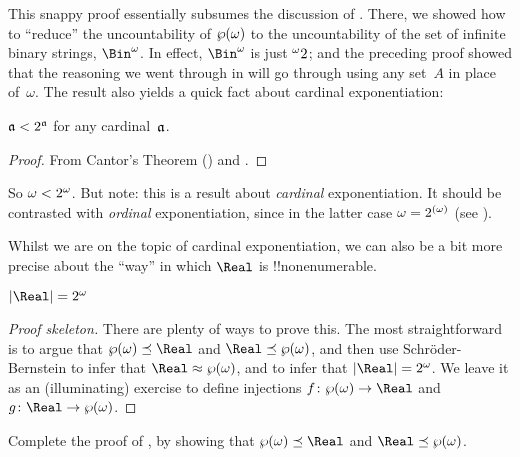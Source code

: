 \documentclass[../../../include/open-logic-section]{subfiles}
\begin{document}
This snappy proof essentially subsumes the discussion of
. There, we showed how to ``reduce'' the
uncountability of $\wp(\omega)$ to the uncountability of the set of
infinite binary strings, $\Bin^\omega$. In effect, $\Bin^{\omega}$ is
just ${}^{\omega}{2}$; and the preceding proof showed that the
reasoning we went through in  will go
through using any set~$A$ in place of~$\omega$. The result also yields
a quick fact about cardinal exponentiation:

\begin{cor}
$\mathfrak{a} < 2^{\mathfrak{a}}$ for any cardinal~$\mathfrak{a}$.
\end{cor}

\begin{proof}
From Cantor's Theorem () and
.
\end{proof}
\noindent
So $\omega < 2^{\omega}$. But note: this is a result about
\emph{cardinal} exponentiation. It should be contrasted with
\emph{ordinal} exponentiation, since in the latter case $\omega =
2^{(\omega)}$ (see ).

Whilst we are on the topic of cardinal exponentiation, we can also be
a bit more precise about the ``way'' in which $\Real$ is
!!{nonenumerable}.

\begin{thm}
$\card{\Real} = \cardexpo{2}{\omega}$
\end{thm}

\begin{proof}[Proof skeleton]
There are plenty of ways to prove this. The most straightforward is to
argue that $\cardle{\Pow{\omega}}{\Real}$ and
$\cardle{\Real}{\Pow{\omega}}$, and then use Schr\"oder-Bernstein to
infer that $\cardeq{\Real}{\Pow{\omega}}$, and
 to infer
that $\card{\Real} = \cardexpo{2}{\omega}$. We leave it as an
(illuminating) exercise to define injections $f \colon
\Pow{\omega} \to \Real$ and $g \colon \Real \to \Pow{\omega}$.
\end{proof}

\begin{prob}
Complete the proof of
, by
showing that $\cardle{\Pow{\omega}}{\Real}$ and
$\cardle{\Real}{\Pow{\omega}}$.
\end{prob}
\end{document}

